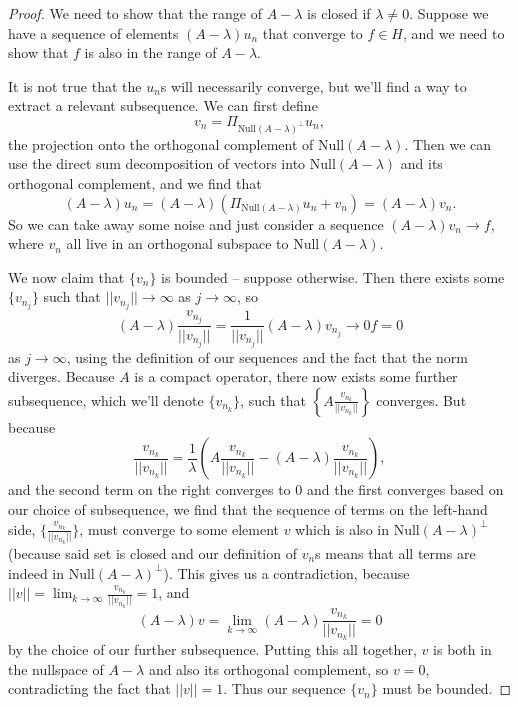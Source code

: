 \begin{proof}
We need to show that the range of $A - \lambda$ is closed if $\lambda \ne 0$. Suppose we have a sequence of elements $(A - \lambda)u_n$ that converge to $f \in H$, and we need to show that $f$ is also in the range of $A - \lambda$. 

It is not true that the $u_n$s will necessarily converge, but we'll find a way to extract a relevant subsequence. We can first define
\[
    v_n = \Pi_{\text{Null}(A - \lambda)^\perp} u_n,
\]
the projection onto the orthogonal complement of $\text{Null}(A - \lambda)$. Then we can use the direct sum decomposition of vectors into $\text{Null}(A - \lambda)$ and its orthogonal complement, and we find that
\[
    (A - \lambda) u_n = (A - \lambda) \left(\Pi_{\text{Null}(A - \lambda)} u_n+ v_n\right) =  (A - \lambda) v_n.
\]
So we can take away some noise and just consider a sequence $(A - \lambda) v_n \to f$, where $v_n$ all live in an orthogonal subspace to $\text{Null}(A - \lambda)$. 

We now claim that $\{v_n\}$ is bounded -- suppose otherwise. Then there exists some $\{v_{n_j}\}$ such that $||v_{n_j}|| \to \infty$ as $j \to \infty$, so
\[
    (A - \lambda) \frac{v_{n_j}}{||v_{n_j}||} = \frac{1}{||v_{n_j}||} (A - \lambda) v_{n_j} \to 0 f = 0
\]
as $j \to \infty$, using the definition of our sequences and the fact that the norm diverges. Because $A$ is a compact operator, there now exists some further subsequence, which we'll denote $\{v_{n_k}\}$, such that $\left\{A\frac{v_{n_k}}{||v_{n_k}||}\right\}$ converges. But because 
\[
    \frac{v_{n_k}}{||v_{n_k}||} = \frac{1}{\lambda} \left(A\frac{v_{n_k}}{||v_{n_k}||} - (A - \lambda) \frac{v_{n_k}}{||v_{n_k}||} \right),
\]
and the second term on the right converges to $0$ and the first converges based on our choice of subsequence, we find that the sequence of terms on the left-hand side, $\{ \frac{v_{n_k}}{||v_{n_k}||}\}$, must converge to some element $v$ which is also in $\text{Null}(A - \lambda)^\perp$ (because said set is closed and our definition of $v_n$s means that all terms are indeed in $\text{Null}(A - \lambda)^\perp$). This gives us a contradiction, because $||v|| = \lim_{k \to \infty}\frac{v_{n_k}}{||v_{n_k}||} = 1$, and 
\[
    (A - \lambda)v = \lim_{k \to \infty} (A - \lambda) \frac{v_{n_k}}{||v_{n_k}||} = 0
\]
by the choice of our further subsequence. Putting this all together, $v$ is both in the nullspace of $A - \lambda$ and also its orthogonal complement, so $v = 0$, contradicting the fact that $||v|| = 1$. Thus our sequence $\{v_n\}$ must be bounded. 


\end{proof}
